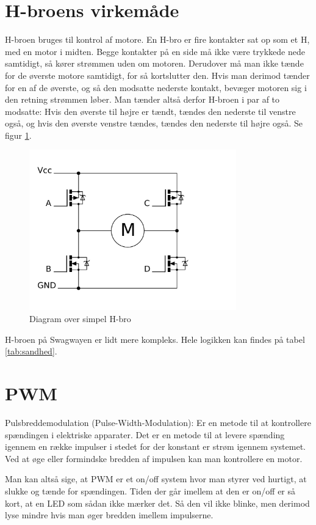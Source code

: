 \documentclass[a4paper,11pt,oneside,article,danish,table]{memoir}
\begin{document}
\section{H-broens virkemåde}
\label{sec:H-broen}
H-broen bruges til kontrol af motore. 
En H-bro er fire kontakter sat op som et H, med en motor i midten. Begge kontakter på en side må ikke være trykkede nede samtidigt, så kører strømmen uden om motoren. Derudover må man ikke tænde for de øverste motore samtidigt, for så kortslutter den. Hvis man derimod tænder for en af de øverste, og så den modsatte nederste kontakt, bevæger motoren sig i den retning strømmen løber. Man tænder altså derfor H-broen i par af to modsatte: Hvis den øverste til højre er tændt, tændes den nederste til venstre også, og hvis den øverste venstre tændes, tændes den nederste til højre også. Se figur \ref{fig:hbro}.
\begin{figure}[htbp]
  \centering
  \includegraphics[width=0.8\textwidth]{pictures/hbrigde.pdf}
  \caption{Diagram over simpel H-bro}
  \label{fig:hbro}
\end{figure}

H-broen på Swagwayen er lidt mere kompleks. Hele logikken kan findes på tabel \ref{tab:sandhed}. 
\section{PWM}
Pulsbreddemodulation (Pulse-Width-Modulation): Er en metode til at kontrollere spændingen i elektriske
apparater. Det er en metode til at levere spænding igennem en række impulser i stedet for der konstant er strøm igennem systemet. Ved at øge eller formindske bredden af impulsen kan man kontrollere en motor.

Man kan altså sige, at PWM er et on/off system hvor man styrer ved hurtigt, at slukke og tænde for
spændingen. Tiden der går imellem at den er on/off er så kort, at en LED som sådan ikke mærker det. Så
den vil ikke blinke, men derimod lyse mindre hvis man øger bredden imellem impulserne.
\end{document}
